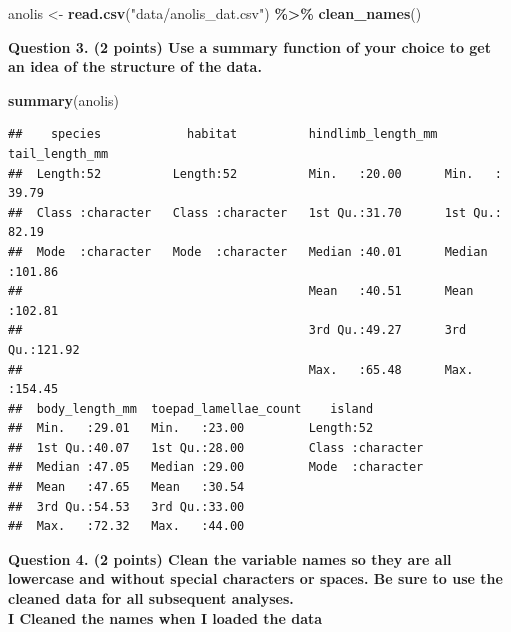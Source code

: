 \documentclass[
]{article}
\newenvironment{Shaded}{\begin{snugshade}}{\end{snugshade}}
\newcommand{\FunctionTok}[1]{\textcolor[rgb]{0.13,0.29,0.53}{\textbf{#1}}}
\newcommand{\NormalTok}[1]{#1}
\newcommand{\OtherTok}[1]{\textcolor[rgb]{0.56,0.35,0.01}{#1}}
\newcommand{\SpecialCharTok}[1]{\textcolor[rgb]{0.81,0.36,0.00}{\textbf{#1}}}
\newcommand{\StringTok}[1]{\textcolor[rgb]{0.31,0.60,0.02}{#1}}
\begin{document}
\begin{Shaded}
\begin{Highlighting}[]
\NormalTok{anolis }\OtherTok{\textless{}{-}} \FunctionTok{read.csv}\NormalTok{(}\StringTok{"data/anolis\_dat.csv"}\NormalTok{) }\SpecialCharTok{\%\textgreater{}\%} \FunctionTok{clean\_names}\NormalTok{()}
\end{Highlighting}
\end{Shaded}

\hfill\break
\hfill\break
\hfill\break

\textbf{Question 3. (2 points) Use a summary function of your choice to
get an idea of the structure of the data.}\\

\begin{Shaded}
\begin{Highlighting}[]
\FunctionTok{summary}\NormalTok{(anolis)}
\end{Highlighting}
\end{Shaded}

\begin{verbatim}
##    species            habitat          hindlimb_length_mm tail_length_mm  
##  Length:52          Length:52          Min.   :20.00      Min.   : 39.79  
##  Class :character   Class :character   1st Qu.:31.70      1st Qu.: 82.19  
##  Mode  :character   Mode  :character   Median :40.01      Median :101.86  
##                                        Mean   :40.51      Mean   :102.81  
##                                        3rd Qu.:49.27      3rd Qu.:121.92  
##                                        Max.   :65.48      Max.   :154.45  
##  body_length_mm  toepad_lamellae_count    island         
##  Min.   :29.01   Min.   :23.00         Length:52         
##  1st Qu.:40.07   1st Qu.:28.00         Class :character  
##  Median :47.05   Median :29.00         Mode  :character  
##  Mean   :47.65   Mean   :30.54                           
##  3rd Qu.:54.53   3rd Qu.:33.00                           
##  Max.   :72.32   Max.   :44.00
\end{verbatim}

\hfill\break
\hfill\break
\hfill\break
\hfill\break

\textbf{Question 4. (2 points) Clean the variable names so they are all
lowercase and without special characters or spaces. Be sure to use the
cleaned data for all subsequent analyses.}\\
\textbf{I Cleaned the names when I loaded the data}

\hfill\break
\hfill\break
\hfill\break
\end{document}
